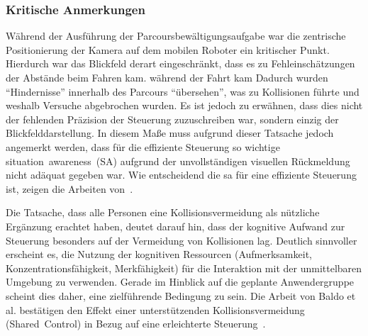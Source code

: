 \subsubsection{Kritische Anmerkungen}
Während der Ausführung der Parcoursbewältigungsaufgabe war die zentrische Positionierung der Kamera auf dem mobilen Roboter ein kritischer Punkt. Hierdurch war das Blickfeld derart eingeschränkt, dass es zu Fehleinschätzungen der Abstände beim Fahren kam. während der Fahrt kam Dadurch wurden \enquote{Hindernisse} innerhalb des Parcours \enquote{übersehen}, was zu Kollisionen führte und weshalb Versuche abgebrochen wurden. Es ist jedoch zu erwähnen, dass dies nicht der fehlenden Präzision der Steuerung zuzuschreiben war, sondern einzig der Blickfelddarstellung. In diesem Maße muss aufgrund dieser Tatsache jedoch angemerkt werden, dass für die effiziente Steuerung so wichtige situation~awareness~(SA) aufgrund der unvollständigen visuellen Rückmeldung nicht adäquat gegeben war. Wie entscheidend die \acs{sa} für eine effiziente Steuerung ist, zeigen die Arbeiten von~\cite{Yanco2004-2}.   

Die Tatsache, dass alle Personen eine Kollisionsvermeidung als nützliche Ergänzung erachtet haben, deutet darauf hin, dass der kognitive Aufwand zur Steuerung besonders auf der Vermeidung von Kollisionen lag. Deutlich sinnvoller erscheint es, die Nutzung der kognitiven Ressourcen (Aufmerksamkeit, Konzentrationsfähigkeit, Merkfähigkeit) für die Interaktion mit der unmittelbaren Umgebung zu verwenden. Gerade im Hinblick auf die geplante Anwendergruppe scheint dies daher, eine zielführende Bedingung zu sein. Die Arbeit von Baldo et al. bestätigen den Effekt einer unterstützenden Kollisionsvermeidung (Shared~Control) in Bezug auf eine erleichterte Steuerung~\cite{Baldo2015}.